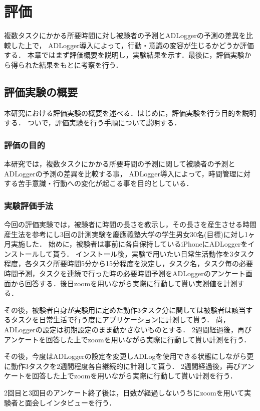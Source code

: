 \chapter{評価}
複数タスクにかかる所要時間に対し被験者の予測とADLoggerの予測の差異を比較した上で，
ADLogger導入によって，行動・意識の変容が生じるかどうか評価する．
本章ではまず評価概要を説明し，実験結果を示す．最後に，評価実験から得られた結果をもとに考察を行う．

\section{評価実験の概要}
本研究における評価実験の概要を述べる．はじめに，評価実験を行う目的を説明する．
ついで，評価実験を行う手順について説明する．

\subsection{評価の目的}
本研究では，複数タスクにかかる所要時間の予測に関して被験者の予測とADLoggerの予測の差異を比較する事，
ADLogger導入によって，時間管理に対する苦手意識・行動への変化が起こる事を目的としている．

\subsection{実験評価手法}
今回の評価実験では，被験者に時間の長さを教示し，その長さを産生させる時間産生法\cite{Oguro1961}\cite{Tayama2018}を参考にし3回の計測実験を慶應義塾大学の学生男女30名(目標)に対し1ヶ月実施した．
始めに，被験者は事前に各自保持しているiPhoneにADLoggerをインストールして貰う．
インストール後，実験で用いたい日常生活動作を3タスク程度，各タスク所要時間5分から15分程度を決定し，タスク名，タスク毎の必要時間予測，タスクを連続で行った時の必要時間予測をADLoggerのアンケート画面から回答する．後日zoom\cite{zoom}を用いながら実際に行動して貰い実測値を計測する．

その後，被験者自身が実験用に定めた動作3タスク分に関しては被験者は該当するタスクを日常生活で行う度にアプリケーションに計測して貰う．
尚，ADLoggerの設定は初期設定のまま動かさないものとする．
2週間経過後，再びアンケートを回答した上でzoom\cite{zoom}を用いながら実際に行動して貰い計測を行う．

その後，今度はADLoggerの設定を変更しADLogを使用できる状態にしながら更に動作3タスクを2週間程度各自継続的に計測して貰う．
2週間経過後，再びアンケートを回答した上でzoom\cite{zoom}を用いながら実際に行動して貰い計測を行う．

2回目と3回目のアンケート終了後は，日数が経過しないうちにzoom\cite{zoom}を用いて実験者と面会しインタビューを行う．

